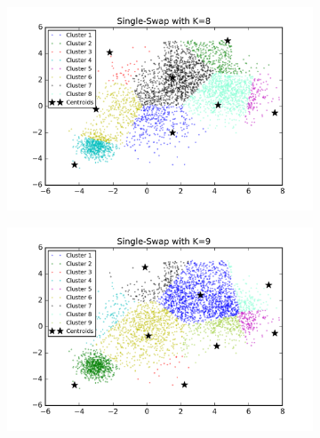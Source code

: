 \begin{figure}[htb]
\begin{subfigure}[b]{0.475\textwidth}
        \end{subfigure}
        \hfill
        \begin{subfigure}[b]{0.475\textwidth}  
            \centering 
            \includegraphics[width=\textwidth]{./figures/bigClustering_singleSwap_8.png}
        \end{subfigure}
        \begin{subfigure}[b]{0.475\textwidth}   
            \centering 
            \includegraphics[width=\textwidth]{./figures/bigClustering_singleSwap_9.png}
        \end{subfigure}
        \hfill
        \begin{subfigure}[b]{0.475\textwidth}   
            \centering 

\end{subfigure}
\end{figure}
